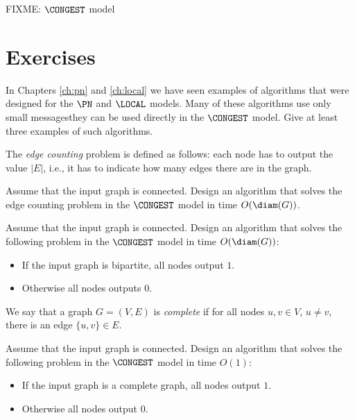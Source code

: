 
FIXME: $\CONGEST$ model

\section{Exercises}

\begin{ex}
    In Chapters \ref{ch:pn} and \ref{ch:local} we have seen examples of algorithms that were designed for the $\PN$ and $\LOCAL$ models. Many of these algorithms use only small messages\mydash they can be used directly in the $\CONGEST$ model. Give at least three examples of such algorithms.
\end{ex}

\begin{ex}
    The \emph{edge counting} problem is defined as follows: each node has to output the value $|E|$, i.e., it has to indicate how many edges there are in the graph.

    Assume that the input graph is connected. Design an algorithm that solves the edge counting problem in the $\CONGEST$ model in time $O(\diam(G))$.
\end{ex}

\begin{ex}
    Assume that the input graph is connected. Design an algorithm that solves the following problem in the $\CONGEST$ model in time $O(\diam(G))$:
    \begin{itemize}[noitemsep]
        \item If the input graph is bipartite, all nodes output $1$.
        \item Otherwise all nodes outputs $0$.
    \end{itemize}
\end{ex}

\begin{ex}
    We say that a graph $G = (V,E)$ is \emph{complete} if for all nodes $u, v \in V$, $u \ne v$, there is an edge $\{u,v\} \in E$.

    Assume that the input graph is connected. Design an algorithm that solves the following problem in the $\CONGEST$ model in time $O(1)$:
    \begin{itemize}[noitemsep]
        \item If the input graph is a complete graph, all nodes output $1$.
        \item Otherwise all nodes output $0$.
    \end{itemize}
\end{ex}

